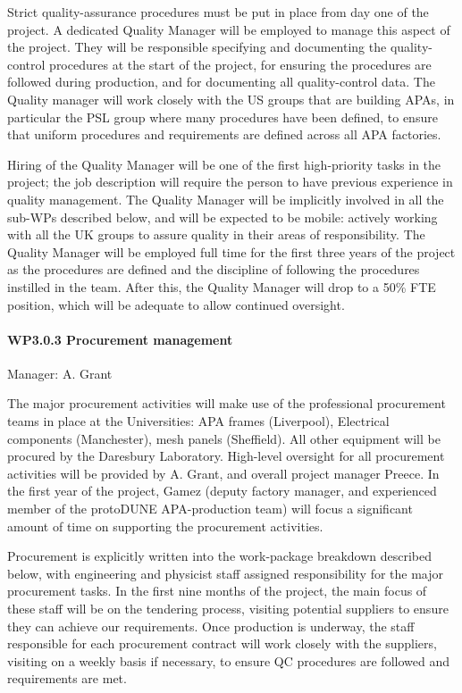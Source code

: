 Strict quality-assurance procedures must be put in place from day one of the project. A dedicated Quality Manager will be employed to manage this aspect of the project. They will be responsible specifying and documenting the quality-control procedures at the start of the project, for ensuring the procedures are followed during production, and for documenting all quality-control data. The Quality manager will work closely with the US groups that are building APAs, in particular the PSL group where many procedures have been defined, to ensure that uniform procedures and requirements are defined across all APA factories.

Hiring of the Quality Manager will be one of the first high-priority tasks in the project; the job description will require the person to have previous experience in quality management.
The Quality Manager will be implicitly involved in all the sub-WPs described below, and will be expected to be mobile: actively working with all the UK groups to assure quality in their areas of responsibility. The Quality Manager will be employed full time for the first three years of the project as the procedures are defined and the discipline of following the procedures instilled in the team. After this, the Quality Manager will drop to a 50\% FTE position, which will be adequate to allow continued oversight.

\paragraph{WP3.0.3 Procurement management}

Manager: A. Grant

The major procurement activities will make use of the professional procurement teams in place at the Universities: APA frames (Liverpool), Electrical components (Manchester), mesh panels (Sheffield). All other equipment will be procured by the Daresbury Laboratory. High-level oversight for all procurement activities will be provided by A. Grant, and overall project manager Preece. In the first year of the project, Gamez (deputy factory manager, and experienced member of the protoDUNE APA-production team) will focus a significant amount of time on supporting the procurement activities.

Procurement is explicitly written into the work-package breakdown described below, with engineering and physicist staff assigned responsibility for the major procurement tasks. In the first nine months of the project, the main focus of these staff will be on the tendering process, visiting potential suppliers to ensure they can achieve our requirements. Once production is underway, the staff responsible for each procurement contract will work closely with the suppliers, visiting on a weekly basis if necessary, to ensure QC procedures are followed and requirements are met.

